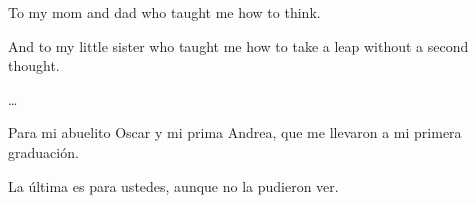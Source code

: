 
\begin{center}
\vspace*{52pt}
To my mom and dad who taught me how to think.

	And to my little sister who taught me how to take a leap without a second thought.

\ldots

	Para mi abuelito Oscar y mi prima Andrea, que me llevaron a mi primera graduaci\'on.
	 
	La \'ultima es para ustedes, aunque no la pudieron ver.
\end{center}

\pagebreak
